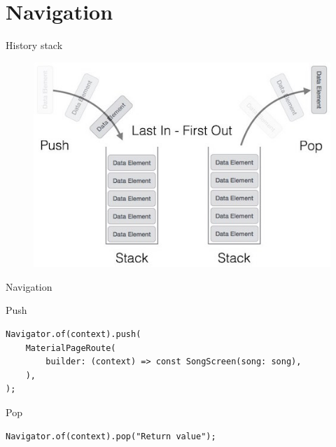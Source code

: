 \section{Navigation}

\begin{frame}{History stack}
    \begin{figure}[h]
        \includegraphics[width=.8\textwidth]{images/stack_representation.jpg}
    \end{figure}
\end{frame}

\begin{frame}[containsverbatim]{Navigation}
    \begin{block}{Push}
        \begin{verbatim}
Navigator.of(context).push(
    MaterialPageRoute(
        builder: (context) => const SongScreen(song: song),
    ),
);
        \end{verbatim}
    \end{block}

    \begin{block}{Pop}
        \begin{verbatim}
Navigator.of(context).pop("Return value");
        \end{verbatim}
    \end{block}
\end{frame}
